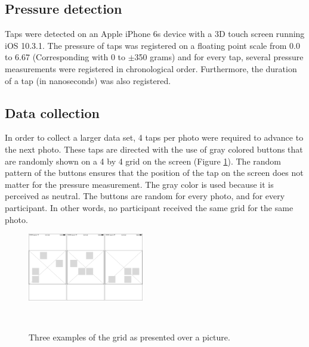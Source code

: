 \documentclass{sigchi}
\begin{document}

\subsection{Pressure detection} %
\label{sub:pressure_detection}
Taps were detected on an Apple iPhone 6s device with a 3D touch screen running iOS 10.3.1. The pressure of taps was registered on a floating point scale from 0.0 to 6.67 (Corresponding with 0 to $\pm$350 grams) and for every tap, several pressure measurements were registered in chronological order. Furthermore, the duration of a tap (in nanoseconds) was also registered.

\subsection{Data collection} %
\label{sub:data_collection}
In order to collect a larger data set, 4 taps per photo were required to advance to the next photo. These taps are directed with the use of gray colored buttons that are randomly shown on a 4 by 4 grid on the screen (Figure \ref{fig:grid}). The random pattern of the buttons ensures that the position of the tap on the screen does not matter for the pressure measurement. The gray color is used because it is perceived as neutral. The buttons are random for every photo, and for every participant. In other words, no participant received the same grid for the same photo.
\begin{figure}[h]
    \centering
    \includegraphics[width=0.45\textwidth]{images/Grid.png}
    \caption{Three examples of the grid as presented over a picture.}~
    \label{fig:grid}
\end{figure}
\end{document}
